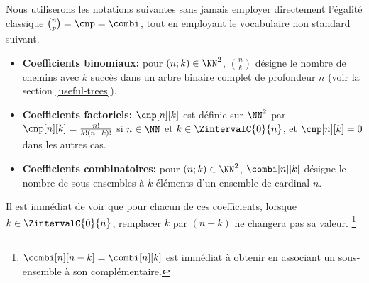 Nous utiliserons les notations suivantes sans jamais employer directement l'égalité classique $\binom{n}{p} = \cnp = \combi$,
tout en employant le vocabulaire non standard suivant.
%
\begin{itemize}
	\item \textbf{Coefficients binomiaux:}
    pour $(n;k) \in \NN^2$,
    $\binom{n}{k}$ désigne le nombre de chemins avec $k$ succès dans un arbre binaire complet de profondeur $n$ (voir la section  \ref{useful-trees}).


	\item \textbf{Coefficients factoriels:}
    $\cnp[n][k]$ est définie sur $\NN^2$ par
	$\cnp[n][k] = \frac{n!}{k!(n-k)!}$ si $n \in \NN$ et $k \in \ZintervalC{0}{n}$,
	et
	$\cnp[n][k] = 0$ dans les autres cas.


	\item \textbf{Coefficients combinatoires:}
    pour $(n;k) \in \NN^2$,
    $\combi[n][k]$ désigne le nombre de sous-ensembles à $k$ éléments d'un ensemble de cardinal $n$.
\end{itemize}

Il est immédiat de voir que pour chacun de ces coefficients, lorsque $k \in \ZintervalC{0}{n}$, remplacer $k$ par $(n-k)$ ne changera pas sa valeur.%
\footnote{
	$\combi[n][n-k] = \combi[n][k]$ est immédiat à obtenir en associant un sous-ensemble à son complémentaire.
}